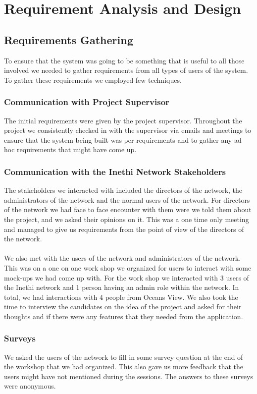 \section{Requirement Analysis and Design}\label{sec:design-decision}
\subsection{Requirements Gathering}\label{subsec:requirements-gathering}
To ensure that the system was going to be something that is useful to all those involved we needed to gather requirements from all types of users of the system.
To gather these requirements we employed few techniques.
\subsubsection{Communication with Project Supervisor}
The initial requirements were given by the project supervisor.
Throughout the project we consistently checked in with the supervisor via emails and meetings to ensure that the system being built was per requirements and to gather any ad hoc requirements that might have come up.
\subsubsection{Communication with the Inethi Network Stakeholders}
The stakeholders we interacted with included the directors of the network, the administrators of the network and the normal users of the network.
For directors of the network we had face to face encounter with them were we told them about the project, and we asked their opinions on it.
This was a one time only meeting and managed to give us requirements from the point of view of the directors of the network.
\paragraph{}
We also met with the users of the network and administrators of the network.
This was on a one on one work shop we organized for users to interact with some mock-ups we had come up with.
For the work shop we interacted with 3 users of the Inethi network and 1 person having an admin role within the network.
In total, we had interactions with 4 people from Oceans View.
We also took the time to interview the candidates on the idea of the project and asked for their thoughts and if there were any features that they needed from the application.
\subsubsection{Surveys}
We asked the users of the network to fill in some survey question at the end of the workshop that we had organized.
This also gave us more feedback that the users might have not mentioned during the sessions.
The answers to these surveys were anonymous.
